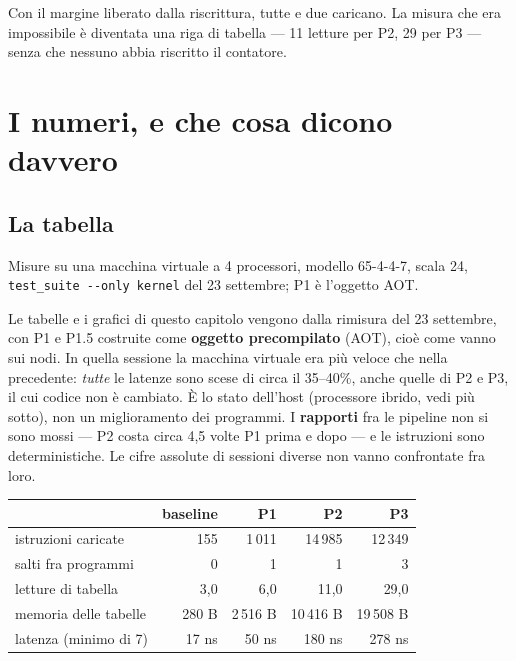 \documentclass[11pt,a4paper,oneside]{report}
\begin{document}
Con il margine liberato dalla riscrittura, tutte e due caricano. La misura che
era impossibile è diventata una riga di tabella --- 11 letture per P2, 29 per P3
--- senza che nessuno abbia riscritto il contatore.

\chapter{I numeri, e che cosa dicono davvero}

\section{La tabella}

Misure su una macchina virtuale a 4 processori, modello 65-4-4-7, scala 24,
\texttt{test\_suite -{}-only kernel} del 23 settembre; P1 è l'oggetto AOT.

\begin{prima}
Le tabelle e i grafici di questo capitolo vengono dalla rimisura del 23 settembre,
con P1 e P1.5 costruite come \textbf{oggetto precompilato} (AOT), cioè come vanno
sui nodi. In quella sessione la macchina virtuale era più veloce che nella
precedente: \emph{tutte} le latenze sono scese di circa il 35--40\%, anche quelle
di P2 e P3, il cui codice non è cambiato. È lo stato dell'host (processore ibrido,
vedi più sotto), non un miglioramento dei programmi. I \textbf{rapporti} fra le
pipeline non si sono mossi --- P2 costa circa 4,5 volte P1 prima e dopo --- e le
istruzioni sono deterministiche. Le cifre assolute di sessioni diverse non vanno
confrontate fra loro.
\end{prima}

\begin{center}
\small
\begin{tabular}{@{}lrrrr@{}}
\toprule
& \textbf{baseline} & \textbf{P1} & \textbf{P2} & \textbf{P3} \\
\midrule
istruzioni caricate & 155 & 1\,011 & 14\,985 & 12\,349 \\
salti fra programmi & 0 & 1 & 1 & 3 \\
letture di tabella  & 3,0 & 6,0 & 11,0 & 29,0 \\
memoria delle tabelle & 280 B & 2\,516 B & 10\,416 B & 19\,508 B \\
latenza (minimo di 7) & 17 ns & 50 ns & 180 ns & 278 ns \\
\bottomrule
\end{tabular}
\end{center}
\end{document}
